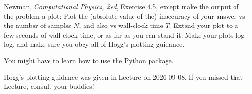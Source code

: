 \documentclass[12pt]{article}
\begin{document}
\begin{problem}
  Newman, \textit{Computational Physics, 2ed}, Exercise 4.5, except make the output of the problem a plot:
  Plot the (absolute value of the) inaccuracy of your answer vs the number of samples $N$, and also vs wall-clock time $T$.
  Extend your plot to a few seconds of wall-clock time, or as far as you can stand it.
  Make your plots log--log, and make sure you obey all of Hogg's plotting guidance.
\end{problem}

\begin{note}
  You might have to learn how to use the Python  package.
\end{note}

\begin{note}
  Hogg's plotting guidance was given in Lecture on 2026-09-08.
  If you missed that Lecture, consult your buddies!
\end{note}
\end{document}
